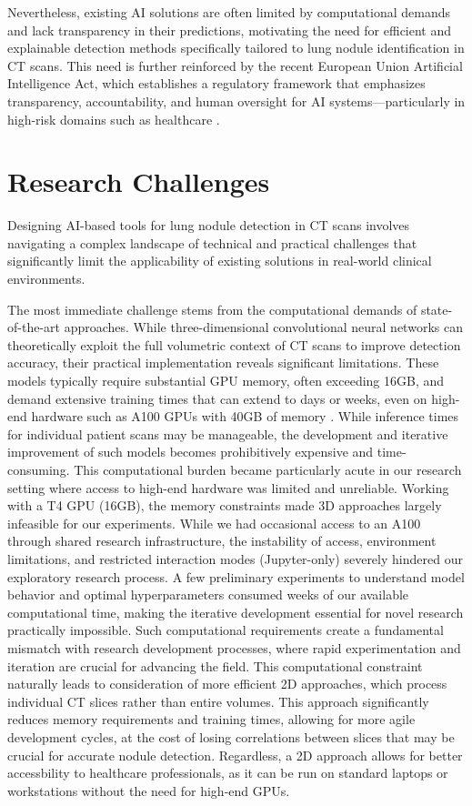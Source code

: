 Nevertheless, existing AI solutions are often limited by computational demands and lack transparency in their predictions, motivating the need for efficient and explainable detection methods specifically tailored to lung nodule identification in CT scans.
This need is further reinforced by the recent European Union Artificial Intelligence Act, which establishes a regulatory framework that emphasizes transparency, accountability, and human oversight for AI systems—particularly in high-risk domains such as healthcare \cite{eu_ai_act}.

\section{Research Challenges}

Designing AI-based tools for lung nodule detection in CT scans involves navigating a complex landscape of technical and practical challenges that significantly limit the applicability of existing solutions in real-world clinical environments.

The most immediate challenge stems from the computational demands of state-of-the-art approaches. While three-dimensional convolutional neural networks can theoretically exploit the full volumetric context of CT scans to improve detection accuracy, their practical implementation reveals significant limitations. These models typically require substantial GPU memory, often exceeding 16GB, and demand extensive training times that can extend to days or weeks, even on high-end hardware such as A100 GPUs with 40GB of memory \cite{wu2018systematicanalysisstateoftheart3d}. While inference times for individual patient scans may be manageable, the development and iterative improvement of such models becomes prohibitively expensive and time-consuming. This computational burden became particularly acute in our research setting where access to high-end hardware was limited and unreliable. Working with a T4 GPU (16GB), the memory constraints made 3D approaches largely infeasible for our experiments. While we had occasional access to an A100 through shared research infrastructure, the instability of access, environment limitations, and restricted interaction modes (Jupyter-only) severely hindered our exploratory research process. A few preliminary experiments to understand model behavior and optimal hyperparameters consumed weeks of our available computational time, making the iterative development essential for novel research practically impossible. Such computational requirements create a fundamental mismatch with research development processes, where rapid experimentation and iteration are crucial for advancing the field.
This computational constraint naturally leads to consideration of more efficient 2D approaches, which process individual CT slices rather than entire volumes. This approach significantly reduces memory requirements and training times, allowing for more agile development cycles, at the cost of losing correlations between slices that may be crucial for accurate nodule detection. Regardless, a 2D approach allows for better accessbility to healthcare professionals, as it can be run on standard laptops or workstations without the need for high-end GPUs.

